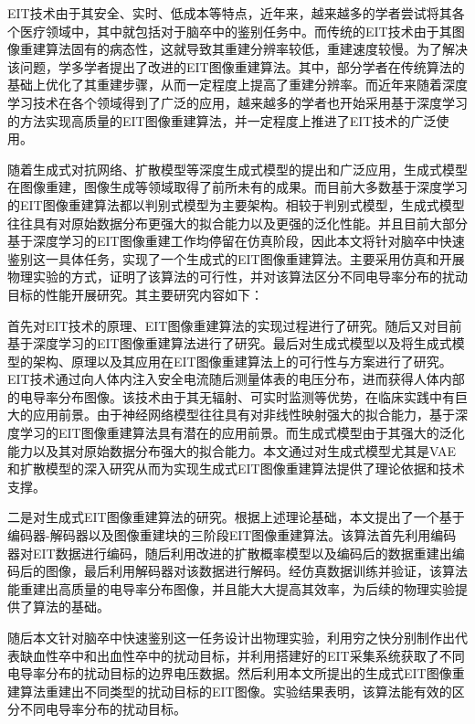 


EIT技术由于其安全、实时、低成本等特点，近年来，越来越多的学者尝试将其各个医疗领域中，其中就包括对于脑卒中的鉴别任务中。而传统的EIT技术由于其图像重建算法固有的病态性，这就导致其重建分辨率较低，重建速度较慢。为了解决该问题，学多学者提出了改进的EIT图像重建算法。其中，部分学者在传统算法的基础上优化了其重建步骤，从而一定程度上提高了重建分辨率。而近年来随着深度学习技术在各个领域得到了广泛的应用，越来越多的学者也开始采用基于深度学习的方法实现高质量的EIT图像重建算法，并一定程度上推进了EIT技术的广泛使用。
 
随着生成式对抗网络、扩散模型等深度生成式模型的提出和广泛应用，生成式模型在图像重建，图像生成等领域取得了前所未有的成果。而目前大多数基于深度学习的EIT图像重建算法都以判别式模型为主要架构。相较于判别式模型，生成式模型往往具有对原始数据分布更强大的拟合能力以及更强的泛化性能。并且目前大部分基于深度学习的EIT图像重建工作均停留在仿真阶段，因此本文将针对脑卒中快速鉴别这一具体任务，实现了一个生成式的EIT图像重建算法。主要采用仿真和开展物理实验的方式，证明了该算法的可行性，并对该算法区分不同电导率分布的扰动目标的性能开展研究。其主要研究内容如下：
 
首先对EIT技术的原理、EIT图像重建算法的实现过程进行了研究。随后又对目前基于深度学习的EIT图像重建算法进行了研究。最后对生成式模型以及将生成式模型的架构、原理以及其应用在EIT图像重建算法上的可行性与方案进行了研究。EIT技术通过向人体内注入安全电流随后测量体表的电压分布，进而获得人体内部的电导率分布图像。该技术由于其无辐射、可实时监测等优势，在临床实践中有巨大的应用前景。由于神经网络模型往往具有对非线性映射强大的拟合能力，基于深度学习的EIT图像重建算法具有潜在的应用前景。而生成式模型由于其强大的泛化能力以及其对原始数据分布强大的拟合能力。本文通过对生成式模型尤其是VAE和扩散模型的深入研究从而为实现生成式EIT图像重建算法提供了理论依据和技术支撑。
 
二是对生成式EIT图像重建算法的研究。根据上述理论基础，本文提出了一个基于编码器-解码器以及图像重建块的三阶段EIT图像重建算法。该算法首先利用编码器对EIT数据进行编码，随后利用改进的扩散概率模型以及编码后的数据重建出编码后的图像，最后利用解码器对该数据进行解码。经仿真数据训练并验证，该算法能重建出高质量的电导率分布图像，并且能大大提高其效率，为后续的物理实验提供了算法的基础。
 
随后本文针对脑卒中快速鉴别这一任务设计出物理实验，利用穷之快分别制作出代表缺血性卒中和出血性卒中的扰动目标，并利用搭建好的EIT采集系统获取了不同电导率分布的扰动目标的边界电压数据。然后利用本文所提出的生成式EIT图像重建算法重建出不同类型的扰动目标的EIT图像。实验结果表明，该算法能有效的区分不同电导率分布的扰动目标。
 
